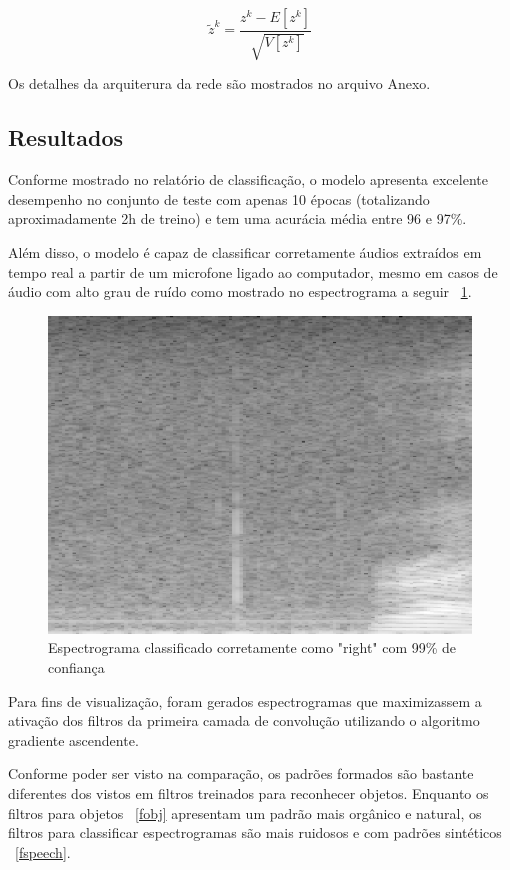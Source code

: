\documentclass{bmvc2k}
\begin{document}
\begin{equation}
\tilde z ^k = \frac{z^k - E[z^k]}{\sqrt[]{V[z^k]}}
\end{equation}

Os detalhes da arquiterura da rede são mostrados no arquivo Anexo.

\subsection*{Resultados}

Conforme mostrado no relatório de classificação, o modelo apresenta excelente
desempenho no conjunto de teste com apenas 10 épocas (totalizando
aproximadamente 2h de treino) e tem uma acurácia média entre 96 e 97\%.

Além disso, o modelo é capaz de classificar corretamente áudios extraídos em
tempo real a partir de um microfone ligado ao computador, mesmo em casos
de áudio com alto grau de ruído como mostrado no espectrograma a seguir ~\ref{audiomic}.

\newpage

\begin{figure}[htbp]
\centering
\includegraphics[scale=0.2]{imagens/micpc.png} 
\caption{Espectrograma classificado corretamente como "right" com 99\% de confiança}
\label{audiomic}
\end{figure}

Para fins de visualização, foram gerados espectrogramas que maximizassem a ativação dos
filtros da primeira camada de convolução utilizando o algoritmo gradiente ascendente.

Conforme poder ser visto na comparação, os padrões formados são bastante diferentes 
dos vistos em filtros treinados para reconhecer objetos. 
Enquanto os filtros para objetos ~\ref{fobj} apresentam um padrão mais orgânico e natural,
os filtros para classificar espectrogramas são mais ruidosos e com padrões
sintéticos ~\ref{fspeech}.
\end{document}
